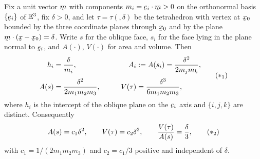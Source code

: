 \begin{lemma}\label{lem:ch6cone}
Fix a unit vector $\bm$ with components $m_{i}=\ip{\be_{i}}\bm>0$ on the
orthonormal basis $\{\be_{i}\}$ of $\mathbb{E}^{3}$, fix $\delta>0$, and let
$\tau=\tau(\bm,\delta)$ be the tetrahedron with vertex at $\bx_{0}$
bounded by the three coordinate planes through $\bx_{0}$ and by the
plane $\ip\bm{(\bx-\bx_{0})}=\delta$. Write $s$ for the oblique face,
$s_{i}$ for the face lying in the plane normal to $\be_{i}$, and
$A(\cdot)$, $V(\cdot)$ for area and volume. Then
\begin{equation}
\begin{aligned}
   h_{i}&=\frac{\delta}{m_{i}},
   &\qquad
   A_{i}&:=A(s_{i})=\frac{\delta^{2}}{2m_{j}m_{k}},\\[2pt]
   A(s)&=\frac{\delta^{2}}{2m_{1}m_{2}m_{3}},
   &\qquad
   V(\tau)&=\frac{\delta^{3}}{6m_{1}m_{2}m_{3}},
\end{aligned}
   \tag{$\ast_{1}$}\label{eq:ch6tetgeom}
\end{equation}
where $h_{i}$ is the intercept of the oblique plane on the $\be_{i}$
axis and $\{i,j,k\}$ are distinct. Consequently
\begin{equation}
   A(s)=c_{1}\delta^{2},\qquad V(\tau)=c_{2}\delta^{3},\qquad
   \frac{V(\tau)}{A(s)}=\frac{\delta}{3},
   \tag{$\ast_{2}$}\label{eq:ch6tetscale}
\end{equation}
with $c_{1}=1/(2m_{1}m_{2}m_{3})$ and $c_{2}=c_{1}/3$ positive and
independent of $\delta$.
\end{lemma}

